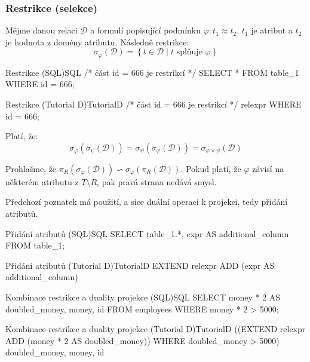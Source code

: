 \subsubsection{Restrikce (selekce)}
Mějme danou relaci $\mathcal{D}$ a formulí popisující podmínku $\varphi : t_{1} \approx t_{2}$. $t_{1}$ je atribut a $t_{2}$ je hodnota z domény atributu. Následně restrikce:
$$
\sigma_{\varphi}(\mathcal{D}) = \left\{ t \in \mathcal{D} \; | \; t \text{ splňuje } \varphi \right\}
$$
\begin{upcode}{Restrikce (SQL)}{}{SQL}
/* část id = 666 je restrikcí */
SELECT * FROM table_1 WHERE id = 666;
\end{upcode}
\begin{upcode}{Restrikce (Tutorial D)}{}{TutorialD}
/* část id = 666 je restrikcí */
relexpr WHERE id = 666;
\end{upcode}
\begin{upquote}
Platí, že:
$$
\sigma_{\varphi}(\sigma_{\psi}(\mathcal{D})) = \sigma_{\psi}(\sigma_{\varphi}(\mathcal{D})) = \sigma_{\varphi \times \psi}(\mathcal{D})
$$
\end{upquote}

Prohlašme, že $\pi_{R} (\sigma_{\varphi} (\mathcal{D})) \backsim \sigma_{\varphi} (\pi_{R} (\mathcal{D}))$. Pokud platí, že $\varphi$ závisí na některém atributu z $T \setminus R$, pak pravá strana nedává smysl.

Předchozí poznatek má použití, a sice duální operaci k projekci, tedy přidání atributů.
\begin{upcode}{Přidání atributů (SQL)}{}{SQL}
SELECT table_1.*, expr AS additional_column FROM table_1;
\end{upcode}
\begin{upcode}{Přidání atributů (Tutorial D)}{}{TutorialD}
EXTEND relexpr ADD (expr AS additional_column)
\end{upcode}
\begin{upcode}{Kombinace restrikce a duality projekce (SQL)}{}{SQL}
SELECT	money * 2 AS doubled_money, money, id
FROM 	employees
WHERE	money * 2 > 5000;
\end{upcode}
\begin{upcode}{Kombinace restrikce a duality projekce (Tutorial D)}{}{TutorialD}
((EXTEND relexpr ADD (money * 2 AS doubled_money))
WHERE doubled_money > 5000) {doubled_money, money, id}
\end{upcode}